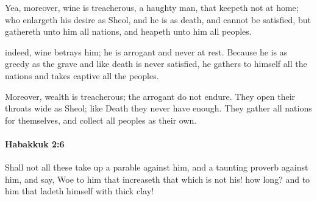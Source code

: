 			\begin{versebox}
					\item[BHS] 
					\item[LXX] 
					\item[ASV] Yea, moreover, wine is treacherous, a haughty man, that keepeth not at home; who enlargeth his desire as Sheol, and he is as death, and cannot be satisfied, but gathereth unto him all nations, and heapeth unto him all peoples.
					\item[NIV] indeed, wine betrays him; he is arrogant and never at rest. Because he is as greedy as the grave and like death is never satisfied, he gathers to himself all the nations and takes captive all the peoples.
					\item[NRSV] Moreover, wealth is treacherous; the arrogant do not endure. They open their throats wide as Sheol; like Death they never have enough. They gather all nations for themselves, and collect all peoples as their own.
			\end{versebox}

		\paragraph{Habakkuk 2:6} %
			\label{HABAKKUK-2-6}

			Shall not all these take up a parable against him, and a taunting proverb against him, and say, Woe to him that increaseth that which is not his! how long? and to him that ladeth himself with thick clay!

